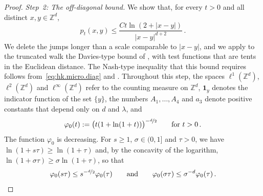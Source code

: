\documentclass[11pt]{amsart}
\numberwithin{equation}{section}
\newcommand{\Z}{\mathbb{Z}}
\newcommand{\nf}{\nicefrac}
\begin{document}
\begin{proof}
\smallskip

\emph{Step~2: The off-diagonal bound.}
We show that, for every $t > 0$ and all distinct $x, y \in \Z^d$,
\begin{equation} \label{eq:offdiagonal}
   p_t(x, y) \leq \frac{C t \ln(2 + |x - y|)}{|x - y|^{d+2}}\,.
\end{equation}
We delete the jumps longer than a scale comparable to $|x - y|$, and we apply to the truncated walk the Davies-type bound of \citet*[Theorem~4.4 and Example~4.3]{ChenKimKumagaiWang2021}, with test functions that are tents in the Euclidean distance.
The Nash-type inequality that this bound requires follows from~\eqref{eq:hk.micro.diag} and \citet[Proposition~3.1(ii)]{ChenKimKumagaiWang2021}.
Throughout this step, the spaces $\ell^1(\Z^d)$, $\ell^2(\Z^d)$ and $\ell^\infty(\Z^d)$ refer to the counting measure on $\Z^d$, $\mathbf{1}_y$ denotes the indicator function of the set $\{y\}$, the numbers $A_1, \ldots, A_4$ and $a_3$ denote positive constants that depend only on $d$ and $\lambda$, and
\begin{equation*}
    \varphi_0(t) := \bigl( t (1 + \ln(1 + t)) \bigr)^{-\nf{d}{2}} \qquad \text{for } t > 0\,.
\end{equation*}
The function $\varphi_0$ is decreasing.
For $s \geq 1$, $\sigma \in (0,1]$ and $\tau > 0$, we have $\ln(1 + s \tau) \geq \ln(1 + \tau)$ and, by the concavity of the logarithm, $\ln(1 + \sigma \tau) \geq \sigma \ln(1 + \tau)$, so that
\begin{equation*}
    \varphi_0(s \tau) \leq s^{-\nf{d}{2}} \varphi_0(\tau)
    \qquad \text{and} \qquad
    \varphi_0(\sigma \tau) \leq \sigma^{-d} \varphi_0(\tau)\,.
\end{equation*}


\end{proof}
\end{document}
